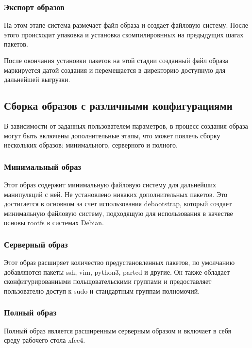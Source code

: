 \subsubsection {Экспорт образов}
На этом этапе система размечает файл образа и создает файловую систему.
После этого происходит упаковка и установка скомпилировнных на предыдущих шагах пакетов.

После окончания установки пакетов на этой стадии созданный файл образа маркируется датой создания и перемещается в директорию доступную для дальнейшей выгрузки.
\newpage
\subsection{Сборка образов с различными конфигурациями}
В зависимости от заданных пользователем параметров, в процесс создания образа могут быть включены дополнительные этапы, что может повлечь сборку нескольких образов: минимального, серверного и полного.
\subsubsection{Минимальный образ}
Этот образ содержит минимальную файловую систему для дальнейших манипуляций с ней. Не установлено никаких дополнительных пакетов.
Это достигается в основном за счет использования debootstrap, который создает минимальную файловую систему, подходящую для использования в качестве основы rootfs в системах Debian.
\subsubsection{Серверный образ}
Этот образ расширяет количество предустановленных пакетов, по умолчанию добавляются пакеты ssh, vim, python3, parted и другие.
Он также обладает сконфигурированными польщовательскими группами и предоставляет пользователю доступ к sudo и стандартным группам полномочий.
\subsubsection{Полный образ}
Полный образ является расширенным серверным образом и включает в себя среду рабочего стола xfce4.
\newpage

